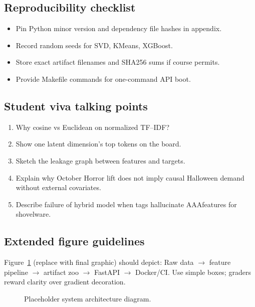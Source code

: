 \subsection{Reproducibility checklist}
\begin{itemize}
\item Pin Python minor version and dependency file hashes in appendix.
\item Record random seeds for SVD, KMeans, XGBoost.
\item Store exact artifact filenames and SHA256 sums if course permits.
\item Provide Makefile commands for one-command API boot.
\end{itemize}

\subsection{Student viva talking points}
\begin{enumerate}
\item Why cosine vs Euclidean on normalized TF--IDF?
\item Show one latent dimension's top tokens on the board.
\item Sketch the leakage graph between features and targets.
\item Explain why October Horror lift does not imply causal Halloween demand without external covariates.
\item Describe failure of hybrid model when tags hallucinate AAAfeatures for shovelware.
\end{enumerate}

\subsection{Extended figure guidelines}
Figure~\ref{fig:placeholder-arch} (replace with final graphic) should depict: Raw data $\rightarrow$ feature pipeline $\rightarrow$ artifact zoo $\rightarrow$ FastAPI $\rightarrow$ Docker/CI. Use simple boxes; graders reward clarity over gradient decoration.

\begin{figure}[t]
\centering{}
\caption{Placeholder system architecture diagram.}\label{fig:placeholder-arch}
\end{figure}

